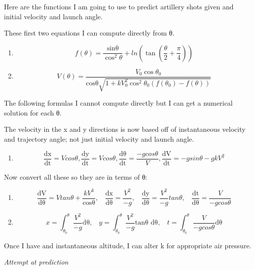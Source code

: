 \documentclass[
]{article}
\providecommand{\tightlist}{%
  \setlength{\itemsep}{0pt}\setlength{\parskip}{0pt}}
\begin{document}
Here are the functions I am going to use to predict artillery shots
given and initial velocity and launch angle.

These first two equations I can compute directly from θ.

\begin{enumerate}
\def\labelenumi{\arabic{enumi}.}
\item
  \[f\left( \theta \right) = \frac{\text{sinθ}}{\cos^{2}\theta} + ln\left(
  \tan\left( \frac{\theta}{2} + \frac{\pi}{4} \right) \right)\]
\item
  \[V\left( \theta \right) = \frac{V_{0}\cos\theta_{0}}{\text{cosθ}\sqrt{1 +
  kV_{0}^{2}\cos^{2}\theta_{0}\left( f\left( \theta_{0} \right) - f\left(
  \theta \right) \right)}}\]
\end{enumerate}

The following formulas I cannot compute directly but I can get a
numerical solution for each θ.

The velocity in the x and y directions is now based off of instantaneous
velocity and trajectory angle; not just initial velocity and launch
angle.

\begin{enumerate}
\def\labelenumi{\arabic{enumi}.}
\tightlist
\item
  \[\frac{\text{dx}}{\text{dt}} = Vcos\theta,
  \frac{\text{dy}}{\text{dt}} = Vcos\theta,
  \frac{\text{dθ}}{\text{dt}} = \frac{- gcos\theta}{V},
  \frac{\text{dV}}{\text{dt}} = - gsin\theta - gkV^{2}\]
\end{enumerate}

Now convert all these so they are in terms of θ:

\begin{enumerate}
\def\labelenumi{\arabic{enumi}.}
\item
  \[\frac{\text{dV}}{\text{dθ}} = Vtan\theta + \frac{kV^{3}}{\text{cosθ}},\ \
  \ \ \frac{\text{dx}}{\text{dθ}} = \frac{V^{2}}{- g},\ \ \ \
  \frac{\text{dy}}{\text{dθ}} = \frac{V^{2}}{- g}tan\theta,\ \ \ \
  \frac{\text{dt}}{\text{dθ}} = \frac{V}{- gcos\theta}\]
\item
  \[x = \int_{\theta_{0}}^{\theta}{\frac{V^{2}}{- g}\text{dθ}},\ \ \ \ y =
  \int_{\theta_{0}}^{\theta}{\frac{V^{2}}{- g}\text{tanθ dθ}},\ \ \ \ t =
  \int_{\theta_{0}}^{\theta}{\frac{V}{- gcos\theta}\text{dθ}}\]
\end{enumerate}

Once I have and instantaneous altitude, I can alter k for appropriate
air pressure.

\emph{Attempt at prediction}
\end{document}
